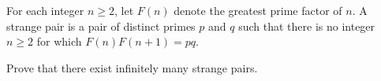 For each integer $n \geq 2$,  let $F(n)$ denote the greatest prime factor of $n$. A strange pair is a pair of distinct primes $p$ and $q$ such that there is no integer $n \geq 2$ for which $F(n)F(n+1)=pq$.

Prove that there exist infinitely many strange pairs.